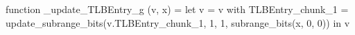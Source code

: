 function _update_TLBEntry_g (v, x) = let v = { v with TLBEntry_chunk_1 = update_subrange_bits(v.TLBEntry_chunk_1, 1, 1, subrange_bits(x, 0, 0)) } in
  v
